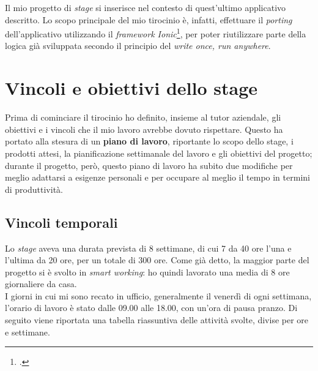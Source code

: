 Il mio progetto di \textit{stage} si inserisce nel contesto di quest'ultimo applicativo descritto. Lo scopo principale del mio tirocinio è, infatti, effettuare il \textit{porting} dell'applicativo utilizzando il \textit{framework Ionic}\footcite{tec:ionic}, per poter riutilizzare parte della logica già sviluppata secondo il principio del \textit{write once, run anywhere}.


\section{Vincoli e obiettivi dello stage}

Prima di cominciare il tirocinio ho definito, insieme al tutor aziendale, gli obiettivi e i vincoli che il mio lavoro avrebbe dovuto rispettare. Questo ha portato alla stesura di un \textbf{piano di lavoro}, riportante lo scopo dello stage, i prodotti attesi, la pianificazione settimanale del lavoro e gli obiettivi del progetto; durante il progetto, però, questo piano di lavoro ha subito due modifiche per meglio adattarsi a esigenze personali e per occupare al meglio il tempo in termini di produttività.

\subsection{Vincoli temporali}

Lo \textit{stage} aveva una durata prevista di 8 settimane, di cui 7 da 40 ore l'una e l'ultima da 20 ore, per un totale di 300 ore. Come già detto, la maggior parte del progetto si è svolto in \textit{smart working}: ho quindi lavorato una media di 8 ore giornaliere da casa. \\
I giorni in cui mi sono recato in ufficio, generalmente il venerdì di ogni settimana, l'orario di lavoro è stato dalle 09.00 alle 18.00, con un'ora di pausa pranzo. Di seguito viene riportata una tabella riassuntiva delle attività svolte, divise per ore e settimane.

